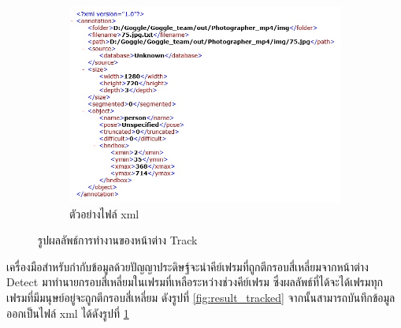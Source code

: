 \begin{figure}[!ht]
\begin{subfigure}[b]{0.7\linewidth}
      \includegraphics[width=\linewidth]{chapter4/images/Result/result_select7.jpg}
      \caption{ตัวอย่างไฟล์ xml}
      \label{fig:result_track_xml}
    \end{subfigure}
    \caption{รูปผลลัพธ์การทำงานของหน้าต่าง Track}
    \label{fig:result_track}
  \end{figure}
เครื่องมือสำหรับกำกับข้อมูลด้วยปัญญาประดิษฐ์จะนำคีย์เฟรมที่ถูกตีกรอบสี่เหลี่ยมจากหน้าต่าง Detect มาทำนายกรอบสี่เหลี่ยมในเฟรมที่เหลือระหว่างช่วงคีย์เฟรม ซึ่งผลลัพธ์ที่ได้จะได้เฟรมทุกเฟรมที่มีมนุษย์อยู่จะถูกตีกรอบสี่เหลี่ยม 
ดังรูปที่ \ref{fig:result_tracked} จากนั้นสามารถบันทึกข้อมูลออกเป็นไฟล์ xml ได้ดังรูปที่ \ref{fig:result_track_xml}

\clearpage
